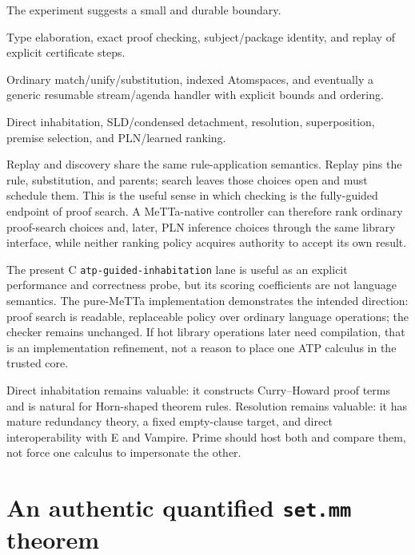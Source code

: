 \documentclass[10pt]{article}
\begin{document}
The experiment suggests a small and durable boundary.

\begin{description}[leftmargin=1.4em,style=nextline]
\item[Prime authority]
Type elaboration, exact proof checking, subject/package identity, and replay of
explicit certificate steps.

\item[General MeTTa mechanism]
Ordinary match/unify/substitution, indexed Atomspaces, and eventually a
generic resumable stream/agenda handler with explicit bounds and ordering.

\item[Imported proof libraries]
Direct inhabitation, SLD/condensed detachment, resolution, superposition,
premise selection, and PLN/learned ranking.
\end{description}

Replay and discovery share the same rule-application semantics.  Replay pins
the rule, substitution, and parents; search leaves those choices open and must
schedule them.  This is the useful sense in which checking is the
fully-guided endpoint of proof search.  A MeTTa-native controller can therefore
rank ordinary proof-search choices and, later, PLN inference choices through
the same library interface, while neither ranking policy acquires authority to
accept its own result.

The present C \texttt{atp-guided-inhabitation} lane is useful as an explicit
performance and correctness probe, but its scoring coefficients are not
language semantics.  The pure-MeTTa  implementation demonstrates
the intended direction: proof search is readable, replaceable policy over
ordinary language operations; the checker remains unchanged.  If hot library
operations later need compilation, that is an implementation refinement, not
a reason to place one ATP calculus in the trusted core.

Direct inhabitation remains valuable: it constructs Curry--Howard proof terms
and is natural for Horn-shaped theorem rules.  Resolution remains valuable: it
has mature redundancy theory, a fixed empty-clause target, and direct
interoperability with E and Vampire.  Prime should host both and compare them,
not force one calculus to impersonate the other.

\section{An authentic quantified \texttt{set.mm} theorem}
\end{document}
